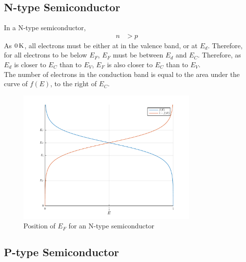 \documentclass[titlepage, fleqn, a4paper, 12pt, twoside]{article}
\theoremstyle{definition}
\theoremstyle{theorem}
\begin{document}
\subsection{N-type Semiconductor}

In a N-type semiconductor,
\begin{align*}
	n & > p
\end{align*}
As $0 \kelvin$, all electrons must be either at in the valence band, or at $E_d$.
Therefore, for all electrons to be below $E_F$, $E_F$ must be between $E_d$ and $E_C$.
Therefore, as $E_d$ is closer to $E_C$ than to $E_V$, $E_F$ is also closer to $E_C$ than to $E_V$.\\
The number of electrons in the conduction band is equal to the area under the curve of $f(E)$, to the right of $E_C$.
\begin{figure}[h]
	\centering
	\includegraphics[width = 0.8\textwidth]{./Plots/fermi_function_for_N_type.pdf}
	\caption{Position of $E_F$ for an N-type semiconductor}
	\label{fig:Position_of_$E_F$_for_an_N-type_semiconductor}
\end{figure}

\subsection{P-type Semiconductor}
\end{document}
